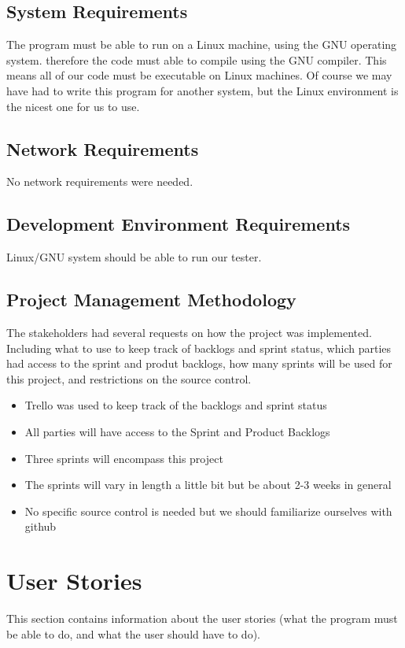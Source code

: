 \subsection{System  Requirements}
The program must be able to run on a Linux machine, using the GNU operating system.   
therefore the code must able to compile using the GNU compiler.   This means all of our
code must be executable on Linux machines.   Of course we may have had to write this
program for another system, but the Linux environment is the nicest one for us to use.


\subsection{Network Requirements}
No network requirements were needed.


\subsection{Development Environment Requirements}
Linux/GNU system should be able to run our tester. 


\subsection{Project  Management Methodology}
The stakeholders had several requests on how the project was implemented. Including 
what to use to keep track of backlogs and sprint status, which parties had access to the
sprint and produt backlogs, how many sprints will be used for this project, and restrictions
on the source control.
 
\begin{itemize}
\item Trello was used to keep track of the backlogs and sprint status
\item All parties will have access to the Sprint and Product Backlogs
\item Three sprints will encompass this project
\item The sprints will vary in length a little bit but be about 2-3 weeks in general
\item No specific source control is needed but we should familiarize ourselves with github
\end{itemize}

\section{User Stories}
This section contains information about the user stories (what the program must be able 
to do, and what the user should have to do).



